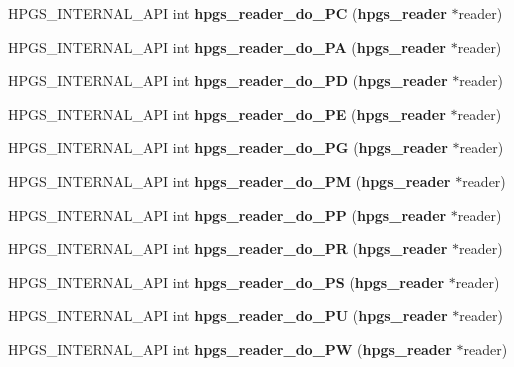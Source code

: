 \begin{DoxyCompactItemize}
\item 
HPGS\_\-INTERNAL\_\-API int {\bfseries hpgs\_\-reader\_\-do\_\-PC} ({\bf hpgs\_\-reader} $\ast$reader)\label{group__reader_ga26e3abc89cd90afe394f3c4a400f9886}

\item 
HPGS\_\-INTERNAL\_\-API int {\bfseries hpgs\_\-reader\_\-do\_\-PA} ({\bf hpgs\_\-reader} $\ast$reader)\label{group__reader_gab98375b63e2e33be791f57a3cba84c8c}

\item 
HPGS\_\-INTERNAL\_\-API int {\bfseries hpgs\_\-reader\_\-do\_\-PD} ({\bf hpgs\_\-reader} $\ast$reader)\label{group__reader_ga5a74597276b52026baea444c783f093f}

\item 
HPGS\_\-INTERNAL\_\-API int {\bfseries hpgs\_\-reader\_\-do\_\-PE} ({\bf hpgs\_\-reader} $\ast$reader)\label{group__reader_gab89ccf2e907504a93092c06e6ff48c7f}

\item 
HPGS\_\-INTERNAL\_\-API int {\bfseries hpgs\_\-reader\_\-do\_\-PG} ({\bf hpgs\_\-reader} $\ast$reader)\label{group__reader_gaa352b34763e04c84c81d154c592c5cd2}

\item 
HPGS\_\-INTERNAL\_\-API int {\bfseries hpgs\_\-reader\_\-do\_\-PM} ({\bf hpgs\_\-reader} $\ast$reader)\label{group__reader_ga1ccebaf839555816bb65f2f2547da7df}

\item 
HPGS\_\-INTERNAL\_\-API int {\bfseries hpgs\_\-reader\_\-do\_\-PP} ({\bf hpgs\_\-reader} $\ast$reader)\label{group__reader_gabd7b5192dd787f46ff9fc8f688e9a4ff}

\item 
HPGS\_\-INTERNAL\_\-API int {\bfseries hpgs\_\-reader\_\-do\_\-PR} ({\bf hpgs\_\-reader} $\ast$reader)\label{group__reader_ga59dde778a90ffa3910b2f6586e30325d}

\item 
HPGS\_\-INTERNAL\_\-API int {\bfseries hpgs\_\-reader\_\-do\_\-PS} ({\bf hpgs\_\-reader} $\ast$reader)\label{group__reader_ga75c6bfe334f61695beaa66b3bfede120}

\item 
HPGS\_\-INTERNAL\_\-API int {\bfseries hpgs\_\-reader\_\-do\_\-PU} ({\bf hpgs\_\-reader} $\ast$reader)\label{group__reader_gab80900542e36944aa5eb9f4608313968}

\item 
HPGS\_\-INTERNAL\_\-API int {\bfseries hpgs\_\-reader\_\-do\_\-PW} ({\bf hpgs\_\-reader} $\ast$reader)\label{group__reader_gabbd62a9fd3ef05c0baaa4a0d87d912b0}


\end{DoxyCompactItemize}
